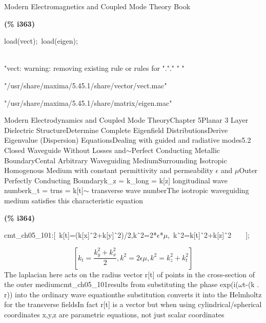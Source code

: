 \documentclass[fleqn]{article}
\begin{document}
Modern Electromagnetics and Coupled Mode Theory Book


\noindent
\begin{minipage}[t]{4.000000em}\color{red}\bfseries
(\% i363)	
\end{minipage}
\begin{minipage}[t]{\textwidth}\color{blue}
load(vect);\ load(eigen);
\end{minipage}
\mbox{}\\"vect: warning: removing existing rule or rules for "."."
" "


\[\tag{\% o362} 
\mbox{}
\]"/usr/share/maxima/5.45.1/share/vector/vect.mac"


\[\tag{\% o363} 
\mbox{}
\]"/usr/share/maxima/5.45.1/share/matrix/eigen.mac"

Modern Electrodynamics and Coupled Mode TheoryChapter 5Planar 3 Layer Dielectric StructureDetermine Complete Eigenfield DistributionsDerive Eigenvalue (Dispersion) EquationsDealing with guided and radiative modes5.2 Closed Waveguide Without Losses and\ensuremath{\sim }Perfect Conducting Metallic BoundaryCental Arbitrary Waveguiding MediumSurrounding Isotropic Homogenous Medium with constant permittivity and permeability \ensuremath{\epsilon} and \ensuremath{\mu}Outer Perfectly Conducting Boundaryk\_z = k\_long = k[z]      longitudinal wave numberk\_t = trns = k[t]\ensuremath{\sim }         transverse wave numberThe isotropic waveguiding medium satisfies this characteristic equation


\noindent
\begin{minipage}[t]{4.000000em}\color{red}\bfseries
(\% i364)	
\end{minipage}
\begin{minipage}[t]{\textwidth}\color{blue}
cmt\_ch05\_101:[\ k[t]=(k[x]\^\ 2+k[y]\^\ 2)/2,k\^\ 2=2*\ensuremath{\epsilon}*\ensuremath{\mu},\ k\^\ 2=k[t]\^\ 2+k[z]\^\ 2\ \ \ \ ];
\end{minipage}
\[\displaystyle \tag{\% o364} 
\left[ {k_t}=\frac{{{k}_{y}^{2}}+{{k}_{x}^{2}}}{2}\operatorname{,}{{k}^{2}}=2 \epsilon  \mu \operatorname{,}{{k}^{2}}={{k}_{z}^{2}}+{{k}_{t}^{2}}\right] \mbox{}
\]
The laplacian here acts on the radius vector r[t] of points in the cross-section of the outer mediumcmt\_ch05\_101results from substituting the phase exp(i(\ensuremath{\omega}t-(k . r)) into the ordinary wave equationthe substitution converts it into the Helmholtz for the transverse fieldsIn fact r[t] is a vector but when using cylindrical/spherical coordinates x,y,z are parametric equations, not just scalar coordinates
\end{document}

